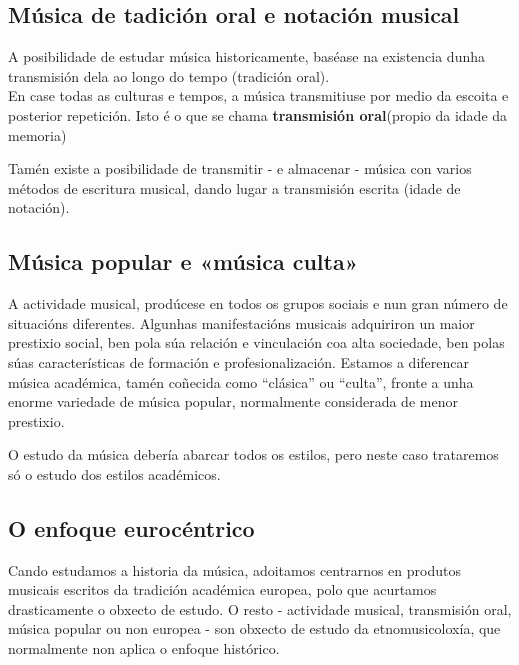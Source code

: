 \documentclass[a4paper, twoside]{templates/ociamthesis}
\begin{document}
\hypertarget{muxfasica-de-tadiciuxf3n-oral-e-notaciuxf3n-musical}{%
\subsection*{Música de tadición oral e notación musical}\label{muxfasica-de-tadiciuxf3n-oral-e-notaciuxf3n-musical}}

A posibilidade de estudar música historicamente, baséase na existencia dunha transmisión dela ao longo do tempo (tradición oral).\\
En case todas as culturas e tempos, a música transmitiuse por medio da escoita e posterior repetición. Isto é o que se chama \textbf{transmisión oral}(propio da idade da memoria)

Tamén existe a posibilidade de transmitir - e almacenar - música con varios métodos de escritura musical, dando lugar a transmisión escrita (idade de notación).

\hypertarget{muxfasica-popular-e-muxfasica-culta}{%
\subsection*{Música popular e «música culta»}\label{muxfasica-popular-e-muxfasica-culta}}

A actividade musical, prodúcese en todos os grupos sociais e nun gran número de situacións diferentes. Algunhas manifestacións musicais adquiriron un maior prestixio social, ben pola súa relación e vinculación coa alta sociedade, ben polas súas características de formación e profesionalización. Estamos a diferencar música académica, tamén coñecida como ``clásica'' ou ``culta'', fronte a unha enorme variedade de música popular, normalmente considerada de menor prestixio.

O estudo da música debería abarcar todos os estilos, pero neste caso trataremos só o estudo dos estilos académicos.

\hypertarget{o-enfoque-eurocuxe9ntrico}{%
\subsection*{O enfoque eurocéntrico}\label{o-enfoque-eurocuxe9ntrico}}

Cando estudamos a historia da música, adoitamos centrarnos en produtos musicais escritos da tradición académica europea, polo que acurtamos drasticamente o obxecto de estudo. O resto - actividade musical, transmisión oral, música popular ou non europea - son obxecto de estudo da etnomusicoloxía, que normalmente non aplica o enfoque histórico.
\end{document}
